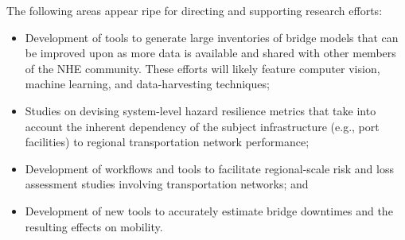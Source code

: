 The following areas appear ripe for directing and supporting research efforts:
\begin{itemize}
    \item Development of tools to generate large inventories of bridge models that can be improved upon as more data is available and shared with other members of the NHE community. These efforts will likely feature computer vision, machine learning, and data-harvesting techniques;

    \item Studies on devising system-level hazard resilience metrics that take into account the inherent dependency of the subject infrastructure (e.g., port facilities) to regional transportation network performance;

    \item Development of workflows and tools to facilitate regional-scale risk and loss assessment studies involving transportation networks; and

    \item Development of new tools to accurately estimate bridge downtimes and the resulting effects on mobility.
\end{itemize}

